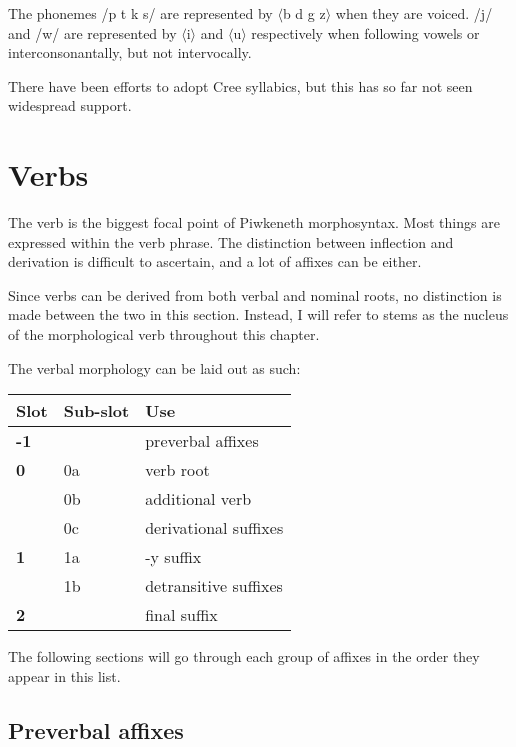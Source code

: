 \documentclass[executivepaper,10pt,twoside,openany,draft]{memoir}
\newcommand{\lang}{Piwkeneth}
\newcommand{\sqbrack}[1]{$\langle$#1$\rangle$}
\begin{document}
The phonemes /p t k s/ are represented by \sqbrack{b d g z} when they are voiced. /j/ and /w/ are represented by \sqbrack{i} and \sqbrack{u} respectively when following vowels or interconsonantally, but not intervocally.

There have been efforts to adopt Cree syllabics, but this has so far not seen widespread support.

\chapter{Verbs} 


The verb is the biggest focal point of \lang{} morphosyntax. Most things are expressed within the verb phrase. The distinction between inflection and derivation is difficult to ascertain, and a lot of affixes can be either.

Since verbs can be derived from both verbal and nominal roots, no distinction is made between the two in this section. Instead, I will refer to stems as the nucleus of the morphological verb throughout this chapter.

The verbal morphology can be laid out as such:

\begin{table}[ht]
    \centering
    \begin{tabular}{>{\bfseries}lll}
        \toprule
        Slot & Sub-slot & Use \\
        \midrule
        -1 & & preverbal affixes \\
        0 & 0a & verb root \\
          & 0b & additional verb \\
          & 0c & derivational suffixes \\
        1 & 1a & -y suffix \\
          & 1b & detransitive suffixes \\
        2 & & final suffix \\
        \bottomrule
    \end{tabular}
\end{table}

The following sections will go through each group of affixes in the order they appear in this list.

\section{Preverbal affixes}
\end{document}
